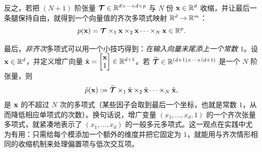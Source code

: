 反之，若把 $(N+1)$ 阶张量 $\bm{\mathcal{T}}\in\mathbb{R}^{ d\times\cdots\times d \times p}$ 与 $N$ 份 $\mathbf{x}\in\mathbb{R}^d$ 收缩，并让最后一条腿保持自由，就得到一个向量值的齐次多项式映射 $\mathbb{R}^d\to\mathbb{R}^m$：
\[
p(\mathbf{x}) = \bm{\mathcal{T}} \times_{1}\mathbf{x} \times_{2}\mathbf{x}\cdots \times_{N}\mathbf{x} \in\mathbb{R}^{p}.
\]

\vspace{0.2cm}
\noindent
最后，\emph{非齐次}多项式可以用一个小技巧得到：\emph{在输入向量末尾添上一个常数 $1$}。设 $\mathbf{x}\in\mathbb{R}^d$，并定义增广向量 $\tilde{\mathbf{x}} =\begin{bmatrix}\mathbf{x}\\1\end{bmatrix}\in\mathbb{R}^{d+1}$。若 $\widetilde{\bm{\mathcal{T}}}\in\mathbb{R}^{(d+1)\times\cdots\times(d+1)}$ 是一个 $N$ 阶张量，则
\[
\tilde{p}(\mathbf{x})
:=
\widetilde{\bm{\mathcal{T}}} \times_{1}\tilde{\mathbf{x}}\times_{2}\tilde{\mathbf{x}}\cdots\times_{N}\tilde{\mathbf{x}},
\]
是 $\mathbf{x}$ 的不超过 $N$ 次的多项式（某些因子会取到最后一个坐标，也就是常数 $1$，从而降低相应单项式的次数）。换句话说，增广变量 $(x_1,\dots,x_d,1)$ 的一个齐次张量多项式，就紧凑地表示了 $(x_1,\dots,x_d)$ 的一般多元多项式。这一观点在实践中尤为有用：只需给每个模添加一个额外的维度并把它固定为 $1$，就能用与齐次情形相同的收缩机制来处理偏置项与低次交互项。  
